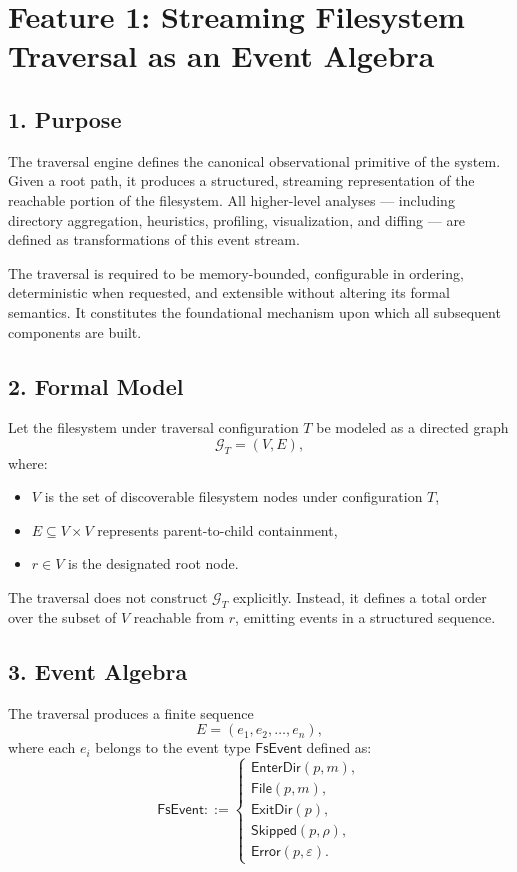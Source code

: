 \section*{Feature 1: Streaming Filesystem Traversal as an Event Algebra}

\subsection*{1. Purpose}

The traversal engine defines the canonical observational primitive of the system. 
Given a root path, it produces a structured, streaming representation of the 
reachable portion of the filesystem. All higher-level analyses --- including 
directory aggregation, heuristics, profiling, visualization, and diffing --- 
are defined as transformations of this event stream.

The traversal is required to be memory-bounded, configurable in ordering, 
deterministic when requested, and extensible without altering its formal semantics. 
It constitutes the foundational mechanism upon which all subsequent components are built.

\subsection*{2. Formal Model}

Let the filesystem under traversal configuration $T$ be modeled as a directed graph
\[
\mathcal{G}_T = (V, E),
\]
where:
\begin{itemize}
    \item $V$ is the set of discoverable filesystem nodes under configuration $T$,
    \item $E \subseteq V \times V$ represents parent-to-child containment,
    \item $r \in V$ is the designated root node.
\end{itemize}

The traversal does not construct $\mathcal{G}_T$ explicitly. Instead, it defines 
a total order over the subset of $V$ reachable from $r$, emitting events in a 
structured sequence.

\subsection*{3. Event Algebra}

The traversal produces a finite sequence
\[
E = (e_1, e_2, \dots, e_n),
\]
where each $e_i$ belongs to the event type $\mathsf{FsEvent}$ defined as:
\[
\mathsf{FsEvent} ::= 
\begin{cases}
\mathsf{EnterDir}(p, m), \\
\mathsf{File}(p, m), \\
\mathsf{ExitDir}(p), \\
\mathsf{Skipped}(p, \rho), \\
\mathsf{Error}(p, \varepsilon).
\end{cases}
\]

